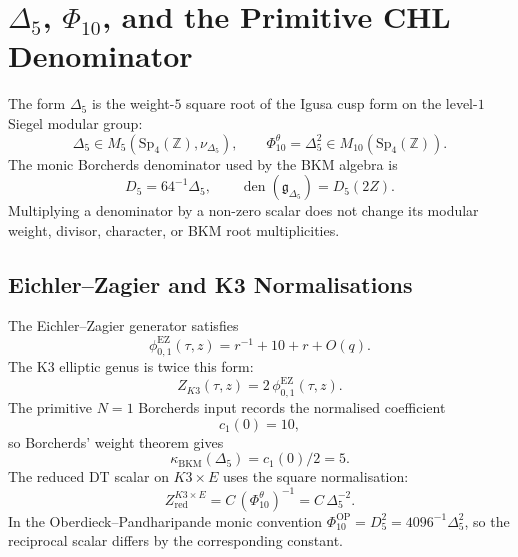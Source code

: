 
\providecommand{\kBKM}{\kappa_{\mathrm{BKM}}}
\providecommand{\kch}{\kappa_{\mathrm{ch}}}
\providecommand{\kcat}{\kappa_{\mathrm{cat}}}
\providecommand{\Sp}{\mathrm{Sp}}
\providecommand{\OO}{\mathrm{O}}
\providecommand{\fg}{\mathfrak{g}}
\providecommand{\fn}{\mathfrak{n}}
\providecommand{\cO}{\mathcal{O}}
\providecommand{\CoHA}{\mathrm{CoHA}}
\providecommand{\mult}{\mathrm{mult}}
\providecommand{\Phih}{\Phi^{\mathrm{FA}}}
\providecommand{\Dfive}{D_5}
\providecommand{\Phiten}{\Phi_{10}}

\section*{$\Delta_5$, $\Phi_{10}$, and the Primitive CHL Denominator}
\label{sec:delta5-foundations-gelfand}

The form $\Delta_5$ is the weight-$5$ square root of the Igusa cusp form
on the level-$1$ Siegel modular group:
\[
  \Delta_5\in M_5(\Sp_4(\mathbb Z),\nu_{\Delta_5}),\qquad
  \Phiten^{\theta}=\Delta_5^2\in M_{10}(\Sp_4(\mathbb Z)).
\]
The monic Borcherds denominator used by the BKM algebra is
\[
  \Dfive=64^{-1}\Delta_5,\qquad
  \operatorname{den}(\fg_{\Delta_5})=\Dfive(2Z).
\]
Multiplying a denominator by a non-zero scalar does not change its
modular weight, divisor, character, or BKM root multiplicities.

\subsection*{Eichler--Zagier and K3 Normalisations}

The Eichler--Zagier generator satisfies
\[
  \phi_{0,1}^{\mathrm{EZ}}(\tau,z)
  =
  r^{-1}+10+r+O(q).
\]
The K3 elliptic genus is twice this form:
\[
  Z_{K3}(\tau,z)=2\,\phi_{0,1}^{\mathrm{EZ}}(\tau,z).
\]
The primitive $N=1$ Borcherds input records the normalised coefficient
\[
  c_1(0)=10,
\]
so Borcherds' weight theorem gives
\[
  \kBKM(\Delta_5)=c_1(0)/2=5.
\]
The reduced DT scalar on $K3\times E$ uses the square normalisation:
\[
  Z^{K3\times E}_{\mathrm{red}}=C\,(\Phiten^\theta)^{-1}
  =C\,\Delta_5^{-2}.
\]
In the Oberdieck--Pandharipande monic convention
$\Phiten^{\mathrm{OP}}=\Dfive^2=4096^{-1}\Delta_5^2$, so the reciprocal
scalar differs by the corresponding constant.

